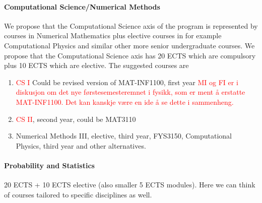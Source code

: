 \documentclass[oneside,final,10pt]{article}
\begin{document}
\paragraph{Computational Science/Numerical Methods}
We propose that the Computational Science axis of the program is represented by courses in Numerical Mathematics plus elective courses in for example Computational Physics and similar other more senior undergraduate courses. We propose that the Computational Science axis has 
20 ECTS which are compulsory plus  10 ECTS which are  elective. The suggested courses are
\begin{enumerate}
    \item \textcolor{red}{CS I} Could be revised version of MAT-INF1100, first year \textcolor{red}{MI og FI er i diskusjon om det nye f\o{}rstesemesteremnet i fysikk, som er ment \aa{} erstatte MAT-INF1100. Det kan kanskje v\ae{}re en ide \aa{} se dette i sammenheng.}
    \item \textcolor{red}{CS II}, second year, could be MAT3110
    \item Numerical Methods III, elective,  third year, FYS3150, Computational Physics, third year and other alternatives. 
\end{enumerate}

\paragraph{Probability and Statistics}
20 ECTS + 10 ECTS elective (also smaller 5 ECTS modules). Here we can think of courses tailored to specific disciplines as well. 
\end{document}
